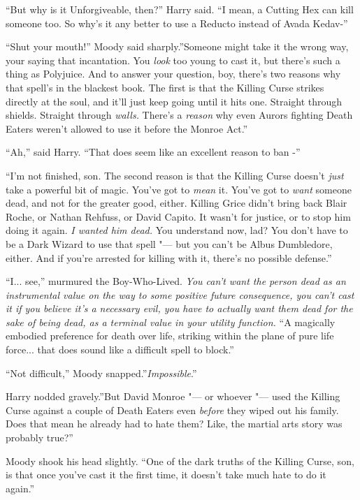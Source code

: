 ``But why is it Unforgiveable, then?'' Harry said. ``I mean, a Cutting
Hex can kill someone too. So why's it any better to use a Reducto
instead of Avada Kedav-''

``Shut your mouth!'' Moody said sharply.''Someone might take it the
wrong way, your saying that incantation. You \emph{look} too young to
cast it, but there's such a thing as Polyjuice. And to answer your
question, boy, there's two reasons why that spell's in the blackest
book. The first is that the Killing Curse strikes directly at the soul,
and it'll just keep going until it hits one. Straight through shields.
Straight through \emph{walls.} There's a \emph{reason} why even Aurors
fighting Death Eaters weren't allowed to use it before the Monroe Act.''

``Ah,'' said Harry. ``That does seem like an excellent reason to ban -''

``I'm not finished, son. The second reason is that the Killing Curse
doesn't \emph{just} take a powerful bit of magic. You've got to
\emph{mean} it. You've got to \emph{want} someone dead, and not for the
greater good, either. Killing Grice didn't bring back Blair Roche, or
Nathan Rehfuss, or David Capito. It wasn't for justice, or to stop him
doing it again. \emph{I wanted him dead.} You understand now, lad? You
don't have to be a Dark Wizard to use that spell "--- but you can't be
Albus Dumbledore, either. And if you're arrested for killing with it,
there's no possible defense.''

``I... see,'' murmured the Boy-Who-Lived. \emph{You can't want the
person dead as an instrumental value on the way to some positive future
consequence, you can't cast it if you believe it's a necessary evil, you
have to actually want them dead for the sake of being dead, as a
terminal value in your utility function.} ``A magically embodied
preference for death over life, striking within the plane of pure life
force... that does sound like a difficult spell to block.''

``Not difficult,'' Moody snapped.''\emph{Impossible}.''

Harry nodded gravely.''But David Monroe "--- or whoever "--- used the Killing
Curse against a couple of Death Eaters even \emph{before} they wiped out
his family. Does that mean he already had to hate them? Like, the
martial arts story was probably true?''

Moody shook his head slightly. ``One of the dark truths of the Killing
Curse, son, is that once you've cast it the first time, it doesn't take
much hate to do it again.''

